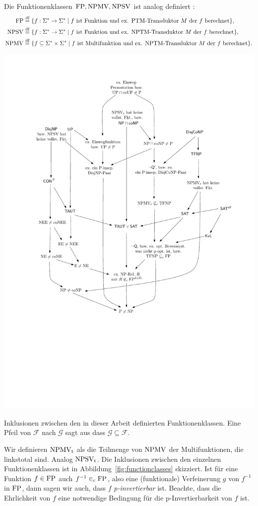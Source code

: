 Die Funktionenklassen $\mathrm{FP}, \mathrm{NPMV}, \mathrm{NPSV}$ ist analog definiert \parencite{selman_taxonomy_1994}:
\begin{align*}
    \mathrm{FP} &\stackrel{\text{df}}{=} \{ f: \Sigma^*\to\Sigma^* \mid \text{$f$ ist Funktion und ex. PTM-Transduktor $M$ der $f$ berechnet} \},\\
    \mathrm{NPSV} &\stackrel{\text{df}}{=} \{ f:\Sigma^*\to\Sigma^* \mid \text{$f$ ist Funktion und ex. NPTM-Transduktor $M$ der $f$ berechnet} \},\\
    \mathrm{NPMV} &\stackrel{\text{df}}{=} \{ f\subseteq \Sigma^*\times\Sigma^* \mid \text{$f$ ist Multifunktion und ex. NPTM-Transduktor $M$ der $f$ berechnet} \}.
\end{align*}
\begin{marginfigure}
    \centering\includegraphics[page=9]{figures.pdf}
    \caption{Inklusionen zwischen den in dieser Arbeit definierten Funktionenklassen. Eine Pfeil von $\mathcal F$ nach $\mathcal G$ sagt aus dass $\mathcal{G}\subseteq \mathcal F$.}\label{fig:functionclasses}
\end{marginfigure}
Wir definieren $\mathrm{NPMV_t}$ als die Teilmenge von $\mathrm{NPMV}$ der Multifunktionen, die linkstotal sind. Analog $\mathrm{NPSV_t}$. Die Inklusionen zwischen den einzelnen Funktionenklassen ist in Abbildung~\ref{fig:functionclasses} skizziert.
Ist für eine Funktion $f\in\mathrm{FP}$ auch $f^{-1}\in_\mathrm{c} \mathrm{FP}$, also eine (funktionale) Verfeinerung $g$ von $f^{-1}$ in $\mathrm{FP}$, dann sagen wir auch, dass $f$ \emph{p-invertierbar} ist. Beachte, dass die Ehrlichkeit von $f$ eine notwendige Bedingung für die p-Invertierbarkeit von $f$ ist.

